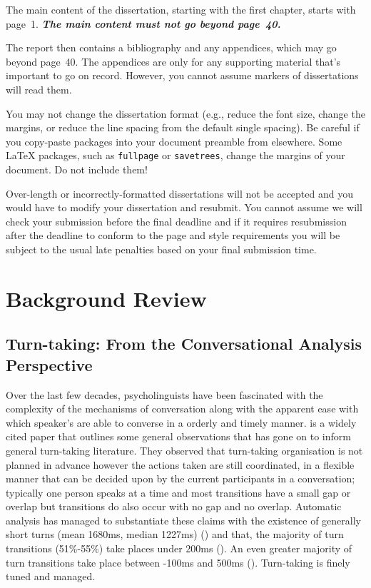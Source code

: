 \documentclass[logo,bsc,singlespacing,parskip]{infthesis}
\begin{document}
The main content of the dissertation, starting with the first chapter,
starts with page~1. \emph{\textbf{The main content must not go beyond page~40.}}

The report then contains a bibliography and any appendices, which may go beyond
page~40. The appendices are only for any supporting material that's important to
go on record. However, you cannot assume markers of dissertations will read them.

You may not change the dissertation format (e.g., reduce the font size, change
the margins, or reduce the line spacing from the default single spacing). Be
careful if you copy-paste packages into your document preamble from elsewhere.
Some \LaTeX{} packages, such as \texttt{fullpage} or \texttt{savetrees}, change
the margins of your document. Do not include them!

Over-length or incorrectly-formatted dissertations will not be accepted and you
would have to modify your dissertation and resubmit. You cannot assume we will
check your submission before the final deadline and if it requires resubmission
after the deadline to conform to the page and style requirements you will be
subject to the usual late penalties based on your final submission time.

\chapter{Background Review}
\section{Turn-taking: From the Conversational Analysis Perspective}
Over the last few decades, psycholinguists have been fascinated with the complexity of the mechanisms of conversation along with the apparent ease with which speaker's are able to converse in a orderly and timely manner. 
\cite{Sacks1974} is a widely cited paper that outlines some general observations that has gone on to inform general turn-taking literature. They observed that turn-taking organisation is not planned in advance however the actions taken are still coordinated, in a flexible manner that can be decided upon by the current participants in a conversation; typically one person speaks at a time and most transitions have a small gap or overlap but transitions do also occur with no gap and no overlap. 
Automatic analysis has managed to substantiate these claims with the existence of generally short turns (mean 1680ms, median 1227ms) (\cite{LevTor2015}) and that, the majority of turn transitions (51\%-55\%) take places under 200ms (\cite{HelEdl2010}). An even greater majority of turn transitions take place between -100ms and 500ms (\cite{LevTor2015}). Turn-taking is finely tuned and managed.
\end{document}
